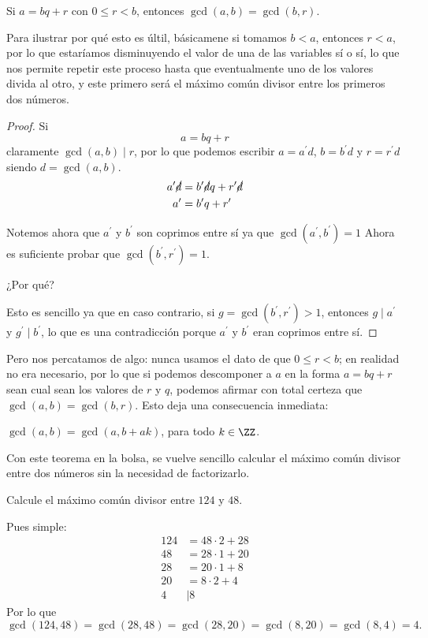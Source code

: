 \begin{theorem}
	Si $a = bq + r$ con $0 \leq r < b$,
	entonces $\gcd (a, b) = \gcd (b, r)$.
\end{theorem}

Para ilustrar por qué esto es últil,
básicamene si tomamos $b < a$, entonces
$r < a$, por lo que estaríamos disminuyendo
el valor de una de las variables sí o sí,
lo que nos permite repetir este
proceso hasta que eventualmente uno de los
valores divida al otro, y este primero
será el máximo común divisor entre los primeros
dos números.

\begin{proof}
	Si
	\[a = bq + r\]
	claramente $\gcd (a, b) \mid r$,
	por lo que podemos escribir $a = a^\prime d$,
	$b = b^\prime d$ y $r = r^\prime d$
	siendo $d = \gcd (a, b)$.
	\begin{align*}
		a^\prime \cancel {d} & = b^\prime \cancel{d}q + r^\prime \cancel{d} \\
		a^\prime             & = b^\prime q + r^\prime
	\end{align*}

	Notemos ahora que $a^\prime$
	y $b^\prime$ son coprimos entre sí
	ya que $\gcd(a^\prime, b^\prime) = 1$
	Ahora es suficiente probar que $\gcd (b^\prime, r^\prime) = 1$.
	\begin{question*}
		¿Por qué?
	\end{question*}

	Esto es sencillo ya que en caso contrario,
	si $g = \gcd (b^\prime, r^\prime) > 1$, entonces
	$g \mid a^\prime$ y $g^\prime \mid b^\prime$,
	lo que es una contradicción porque
	$a^\prime$ y $b^\prime$ eran coprimos entre sí.
\end{proof}

Pero nos percatamos de algo:
nunca usamos el dato de que
$0 \leq r < b$; en realidad no era
necesario, por lo que si podemos
descomponer a $a$ en la forma
$a = bq + r$ sean cual sean
los valores de $r$ y $q$,
podemos afirmar con total certeza que
$\gcd(a, b) = \gcd (b, r)$.
Esto deja una consecuencia inmediata:
\begin{corollary}
	$\gcd(a, b) = \gcd(a, b + ak)$, para todo $k \in \ZZ$.
\end{corollary}

Con este teorema en la bolsa, se vuelve
sencillo calcular el máximo común divisor
entre dos números sin la necesidad de factorizarlo.

\begin{example}
	Calcule el máximo común divisor entre
	$124$ y $48$.
\end{example}
Pues simple:
\begin{align*}
	124 & = 48 \cdot 2 + 28 \\
	48  & = 28 \cdot 1 + 20 \\
	28  & = 20 \cdot 1 + 8  \\
	20  & = 8 \cdot 2 + 4   \\
	4   & \mid 8
\end{align*}
Por lo que
\[\gcd (124, 48) = \gcd(28, 48) = \gcd(28, 20) = \gcd(8, 20) = \gcd(8, 4) = 4.\]

